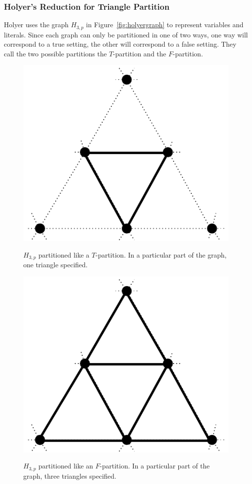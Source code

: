 \documentclass[runningheads,a4paper]{llncs}
\begin{document}
\subsubsection{Holyer's Reduction for Triangle Partition}
%
%
% 
Holyer uses the graph $H_{3,p}$ in Figure~\ref{fig:holyergraph} to represent variables and literals. Since each graph can only be partitioned in one of two ways, one way will correspond to a true setting, the other will correspond to a false setting. They call the two possible partitions the $T$-partition and the $F$-partition. 

\begin{figure}
\begin{minipage}{0.5\linewidth}
\centering
\includegraphics[scale=0.5]{Tpartition.pdf}
\label{fig:tpart}
\caption{$H_{3,p}$ partitioned like a $T$-partition. In a particular part of the graph, one triangle specified.}
\end{minipage}
\hfill
\begin{minipage}{0.5\linewidth}
\centering
\label{fig:fpart}
\includegraphics[scale=0.5]{Fpartition.pdf}
\caption{$H_{3,p}$ partitioned like an $F$-partition. In a particular part of the graph, three triangles specified.}
\end{minipage}
\end{figure}
\end{document}
